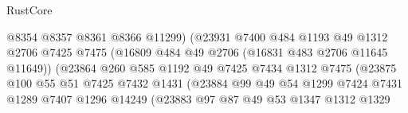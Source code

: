 \begin{lexlean}{RustCore}
\begin{coremodule}
                                          @8354
                                          @8357
                                          @8361
                                          @8366
                                          @11299)
                                        (@23931
                                          @7400
                                          @484
                                          @1193
                                          @49
                                          @1312
                                          @2706
                                          @7425
                                          @7475
                                          (@16809 @484 @49 @2706 (@16831 @483 @2706 @11645 @11649))
                                          (@23864
                                            @260
                                            @585
                                            @1192
                                            @49
                                            @7425
                                            @7434
                                            @1312
                                            @7475
                                            (@23875
                                              @100
                                              @55
                                              @51
                                              @7425
                                              @7432
                                              @1431
                                              (@23884
                                                @99
                                                @49
                                                @54
                                                @1299
                                                @7424
                                                @7431
                                                @1289
                                                @7407
                                                @1296
                                                @14249
                                                (@23883
                                                  @97
                                                  @87
                                                  @49
                                                  @53
                                                  @1347
                                                  @1312
                                                  @1329

\end{coremodule}
\end{lexlean}
